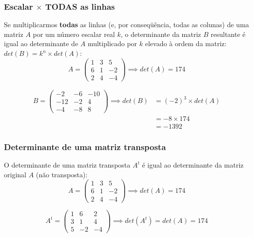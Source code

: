 \documentclass[pdftex, brazil]{beamer}
\begin{document}
\begin{frame}[t]
  \frametitle{Escalar $\times$ TODAS as linhas}
  Se multiplicarmos \textbf{todas} as linhas (e, por conseqüência, todas as
  colunas) de uma matriz $A$ por um número escalar real $k$, o determinante da
  matriz $B$ resultante é igual ao determinante de $A$ multiplicado por $k$ elevado
  à ordem da matriz: $det(B) = k^n \times det(A)$:
  \begin{equation*}A = \begin{pmatrix}
    1 & 3 & 5\\
    6 & 1 & -2\\
    2 & 4 & -4\end{pmatrix} \implies det(A) = 174\end{equation*}

  \begin{equation*}\begin{split}B = \begin{pmatrix}
    -2 & -6 & -10\\
    -12 & -2 & 4\\
    -4 & -8 & 8\end{pmatrix} \implies det(B) &= (-2)^3 \times det(A)\\
                                             &= -8 \times 174\\
                                             &= -1392\end{split}\end{equation*}
\end{frame}

\begin{frame}[t]
  \frametitle{Determinante de uma matriz transposta}
  O determinante de uma matriz transposta $A^t$ é igual ao determinante da
  matriz original $A$ (não transposta):
  $$A = \begin{pmatrix}
    1 & 3 & 5\\
    6 & 1 & -2\\
    2 & 4 & -4\end{pmatrix} \implies det(A) = 174$$

  $$A^t = \begin{pmatrix}
    1 & 6 & 2\\
    3 & 1 & 4\\
    5 & -2 & -4\end{pmatrix} \implies det(A^t) = det(A) = 174$$
\end{frame}
\end{document}
